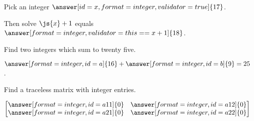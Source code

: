 \documentclass{ximera}
\begin{document}
\begin{problem}
  Pick an integer $\answer[id=x,format=integer,validator=true]{17}$.

  Then solve $\js{x} + 1$ equals $\answer[format=integer,validator=this==x+1]{18}$.
\end{problem}

\begin{problem}
  Find two integers which sum to twenty five.

  \begin{validator}[a+b==25]
    $\answer[format=integer,id=a]{16} + \answer[format=integer,id=b]{9} = 25$.
  \end{validator}


  Find a traceless matrix with integer entries.
  \begin{validator}[a11+a22==0]
    \[
      \begin{bmatrix}
        \answer[format=integer,id=a11]{0} &         \answer[format=integer,id=a12]{0} \\
        \answer[format=integer,id=a21]{0} &         \answer[format=integer,id=a22]{0} \\
      \end{bmatrix}
      \]
  \end{validator}

\end{problem}
\end{document}
